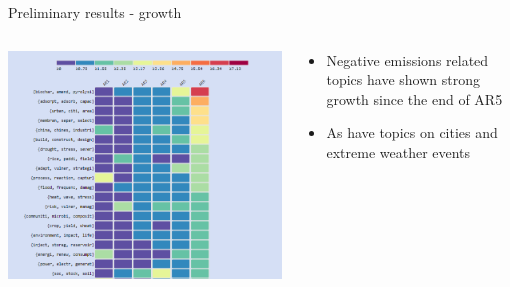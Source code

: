 \documentclass[9pt]{beamer}
\begin{document}
\begin{frame}{Preliminary results - growth}

\begin{columns}
	\begin{column}{0.6\linewidth}
		\begin{center}
			\includegraphics[width=\linewidth]{../plots/top_20_386.png}
		\end{center}
	\end{column}
	\begin{column}{0.4\linewidth}
		\begin{center}
			\begin{itemize}
				\item Negative emissions related topics have shown strong growth since the end of AR5
				\item As have topics on cities and extreme weather events
			\end{itemize}
		\end{center}
	\end{column}
\end{columns}

\end{frame}
\end{document}
